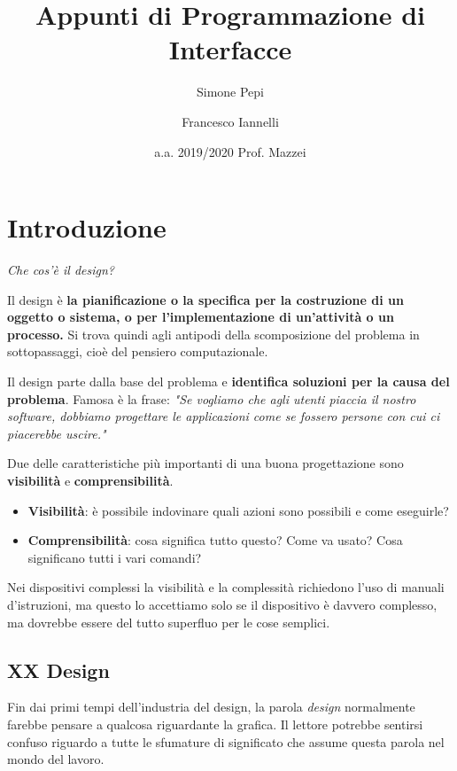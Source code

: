 \documentclass[a4paper,11pt,oneside]{book}
\begin{document}
\title{Appunti di Programmazione di Interfacce}

\author[1]{Simone Pepi}
\author[2]{Francesco Iannelli}
\date{a.a. 2019/2020 Prof. Mazzei}
\maketitle

\chapter{Introduzione}
\begin{flushleft}
	\textit{Che cos'è il design?}
\end{flushleft}
Il design è \textbf{la pianificazione o la specifica per la costruzione di un oggetto o sistema, o per l'implementazione di un'attività o un processo.} Si trova quindi agli antipodi della scomposizione del problema in sottopassaggi, cioè del pensiero computazionale.

Il design parte dalla base del problema e \textbf{identifica soluzioni per la causa del problema}.
Famosa è la frase: \textit{"Se vogliamo che agli utenti piaccia il nostro software, dobbiamo progettare le applicazioni come se fossero persone con cui ci piacerebbe uscire."}

Due delle caratteristiche più importanti di una buona progettazione sono \textbf{visibilità} e \textbf{comprensibilità}.

\begin{itemize}
	\item \textbf{Visibilità}: è possibile indovinare quali azioni sono possibili e come eseguirle?
	\item \textbf{Comprensibilità}: cosa significa tutto questo? Come va usato? Cosa significano tutti i vari comandi?
\end{itemize}

Nei dispositivi complessi la visibilità e la complessità richiedono l'uso di manuali d'istruzioni, ma questo lo accettiamo solo se il dispositivo è davvero complesso, ma dovrebbe essere del tutto superfluo per le cose semplici.

\section{XX Design}
Fin dai primi tempi dell'industria del design, la parola \textit{design} normalmente farebbe pensare a qualcosa riguardante la grafica. Il lettore potrebbe sentirsi confuso riguardo a tutte le sfumature di significato che assume questa parola nel mondo del lavoro.
\end{document}
